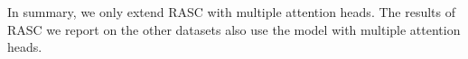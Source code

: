 In summary, we only extend RASC with multiple attention heads. The results of RASC we report on the other datasets also use the model with multiple attention heads. 
%


